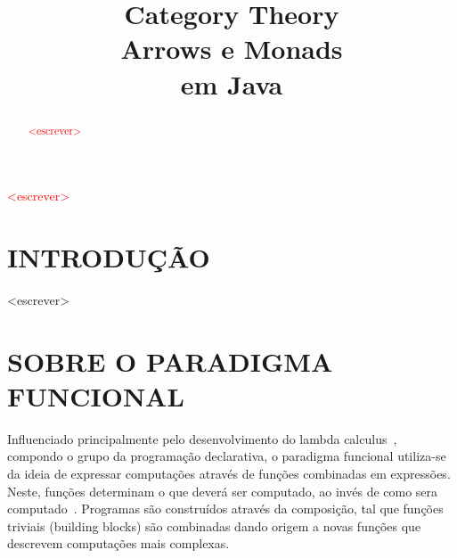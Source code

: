 \documentclass[10pt, conference]{IEEEtran}
\begin{document}

\title { 
	Category Theory \\
	Arrows e Monads \\
	em Java 
}

\author{


	\and	
	
}
					  
\maketitle

\thispagestyle{plain}
\pagestyle{plain}

\begin{abstract}

\textcolor{red}{<escrever>}

\end{abstract}

\begin{IEEEkeywords}

\textcolor{red}{<escrever>}

\end{IEEEkeywords}

\section{INTRODUÇÃO}
\label{sec:intro}

<escrever>

\section{SOBRE O PARADIGMA FUNCIONAL}
\label{sec:func-para}
Influenciado principalmente pelo desenvolvimento do lambda calculus~\cite{hudak1989conception}, compondo o grupo da programação declarativa, o paradigma funcional utiliza-se da ideia de expressar computações através de funções combinadas em expressões. Neste, funções determinam o que deverá ser computado, ao invés de como sera computado~\cite{louden2011programming}. Programas são construídos através da composição, tal que funções triviais (building blocks) são combinadas dando origem a novas funções que descrevem computações mais complexas.
\end{document}
